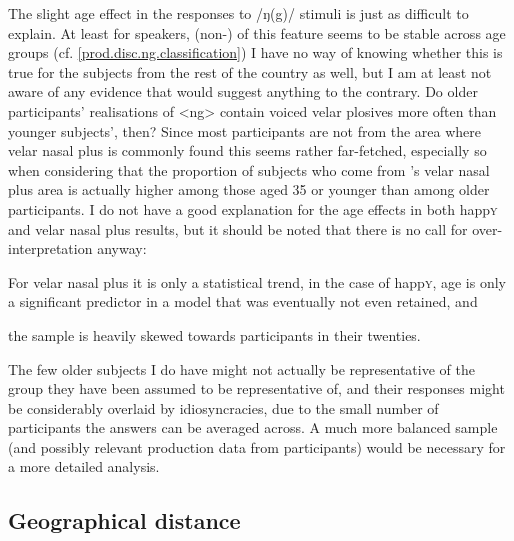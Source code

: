 The slight age effect in the responses to /ŋ(g)/ stimuli is just as difficult to explain.
At least for  speakers, (non-) of this feature seems to be stable across age groups (cf. \ref{prod.disc.ng.classification})
I have no way of knowing whether this is true for the subjects from the rest of the country as well, but I am at least not aware of any evidence that would suggest anything to the contrary.
Do older participants' realisations of <ng> contain voiced velar plosives more often than younger subjects', then?
Since most participants are not from the area where velar nasal plus is commonly found this seems rather far-fetched, especially so when considering that the proportion of subjects who come from \citeauthor{trudgill1999}'s \citeyear{trudgill1999} velar nasal plus area is actually higher among those aged 35 or younger than among older participants.
I do not have a good explanation for the age effects in both happ\textsc{y} and velar nasal plus results, but it should be noted that there is no call for over-interpretation anyway:
	\begin{inparaenum}[(a)]
		\item For velar nasal plus it is only a statistical trend, in the case of happ\textsc{y}, age is only a significant predictor in a model that was eventually not even retained, and
		\item the sample is heavily skewed towards participants in their twenties.
	\end{inparaenum}
The few older subjects I do have might not actually be representative of the group they have been assumed to be representative of, and their responses might be considerably overlaid by idiosyncracies, due to the small number of participants the answers can be averaged across.
A much more balanced sample (and possibly relevant production data from participants) would be necessary for a more detailed analysis.

		\subsection{Geographical distance}

